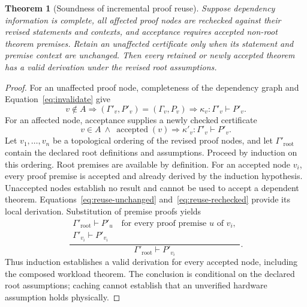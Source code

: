 \documentclass[11pt]{article}
\newtheorem{theorem}{Theorem}
\begin{document}
\begin{theorem}[Soundness of incremental proof reuse]\label{thm:reuse}
Suppose dependency information is complete, all affected proof nodes are rechecked against their revised statements and contexts, and acceptance requires accepted non-root theorem premises. Retain an unaffected certificate only when its statement and premise context are unchanged. Then every retained or newly accepted theorem has a valid derivation under the revised root assumptions.
\end{theorem}
\begin{proof}
For an unaffected proof node, completeness of the dependency graph and Equation~\ref{eq:invalidate} give
\begin{equation}
 v\notin A\Longrightarrow
 (\Gamma'_v,P'_v)=(\Gamma_v,P_v)
 \Longrightarrow \kappa_v:\Gamma'_v\vdash P'_v.
 \label{eq:reuse-unchanged}
\end{equation}
For an affected node, acceptance supplies a newly checked certificate
\begin{equation}
 v\in A\ \land\ \operatorname{accepted}(v)
 \Longrightarrow\kappa'_v:\Gamma'_v\vdash P'_v.
 \label{eq:reuse-rechecked}
\end{equation}
Let $v_1,\ldots,v_n$ be a topological ordering of the revised proof nodes, and let $\Gamma'_{\mathrm{root}}$ contain the declared root definitions and assumptions. Proceed by induction on this ordering. Root premises are available by definition. For an accepted node $v_i$, every proof premise is accepted and already derived by the induction hypothesis. Unaccepted nodes establish no result and cannot be used to accept a dependent theorem. Equations~\ref{eq:reuse-unchanged} and~\ref{eq:reuse-rechecked} provide its local derivation. Substitution of premise proofs yields
\begin{equation}
 \frac{
  \begin{gathered}
   \Gamma'_{\mathrm{root}}\vdash P'_u\quad\text{for every proof premise }u\text{ of }v_i,\\
   \Gamma'_{v_i}\vdash P'_{v_i}
  \end{gathered}
 }{\Gamma'_{\mathrm{root}}\vdash P'_{v_i}}.
\end{equation}
Thus induction establishes a valid derivation for every accepted node, including the composed workload theorem. The conclusion is conditional on the declared root assumptions; caching cannot establish that an unverified hardware assumption holds physically.
\end{proof}
\end{document}

